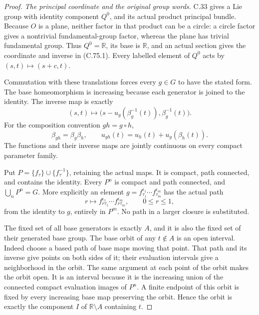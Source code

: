 \begin{proof}
\emph{The principal coordinate and the original group words.}
C.33 gives a Lie group with identity component
$Q^0$, and its actual product principal bundle.
Because $O$ is a plane, neither factor in that
product can be a circle: a circle factor gives
a nontrivial fundamental-group factor, whereas
the plane has trivial fundamental group.
Thus $Q^0=\mathbb R$, its base is $\mathbb R$,
and an actual section gives the coordinate
and inverse in (C.75.1).
Every labelled element of $Q^0$ acts by
$(s,t)\mapsto(s+c,t)$.

Commutation with these translations forces
every $g\in G$ to have the stated form.
The base homeomorphism is increasing because
each generator is joined to the identity.
The inverse map is exactly
\[
 (s,t)\longmapsto
       \bigl(s-u_g(\beta_g^{-1}(t)),\beta_g^{-1}(t)\bigr).
                                                               \tag{C.75.5}
\]
For the composition convention $gh=g\circ h$,
\[
 \beta_{gh}=\beta_g\beta_h,\qquad
 u_{gh}(t)=u_h(t)+u_g(\beta_h(t)).
                                                               \tag{C.75.6}
\]
The functions and their inverse maps are jointly
continuous on every compact parameter family.

Put $P=\{f_\tau\}\cup\{f_\tau^{-1}\}$, retaining
the actual maps. It is compact, path connected,
and contains the identity. Every $P^n$ is compact
and path connected, and $\bigcup_nP^n=G$.
More explicitly an element
$g=f_{\tau_1}^{\epsilon_1}\cdots
f_{\tau_m}^{\epsilon_m}$ has the actual path
\[
 r\longmapsto
 f_{r\tau_1}^{\epsilon_1}\cdots
 f_{r\tau_m}^{\epsilon_m},\qquad 0\leq r\leq1,
                                                               \tag{C.75.7}
\]
from the identity to $g$, entirely in $P^m$.
No path in a larger closure is substituted.

The fixed set of all base generators is
exactly $A$, and it is also the fixed set
of their generated base group.
The base orbit of any $t\notin A$ is an
open interval. Indeed choose a based path
of base maps moving that point. That
path and its inverse give points on both
sides of it; their evaluation intervals
give a neighborhood in the orbit.
The same argument at each point of the
orbit makes the orbit open. It is an
interval because it is the increasing
union of the connected compact evaluation
images of $P^n$.
A finite endpoint of this orbit is fixed
by every increasing base map preserving
the orbit. Hence the orbit is exactly
the component $I$ of $\mathbb R\setminus A$
containing $t$.


\end{proof}
